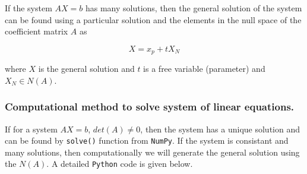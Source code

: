 \documentclass[
  letterpaper,
  DIV=11,
  numbers=noendperiod]{scrreprt}
\theoremstyle{plain}
\theoremstyle{definition}
\theoremstyle{remark}
\begin{document}
\begin{tcolorbox}[enhanced jigsaw, leftrule=.75mm, bottomtitle=1mm, colback=white, toptitle=1mm, opacitybacktitle=0.6, toprule=.15mm, colbacktitle=quarto-callout-note-color!10!white, arc=.35mm, colframe=quarto-callout-note-color-frame, title=\textcolor{quarto-callout-note-color}{\faInfo}\hspace{0.5em}{Use of Null space in creation of general solution from particular
solution}, titlerule=0mm, rightrule=.15mm, left=2mm, bottomrule=.15mm, breakable, coltitle=black, opacityback=0]

If the system \(AX=b\) has many solutions, then the general solution of
the system can be found using a particular solution and the elements in
the null space of the coefficient matrix \(A\) as

\[X=x_p+tX_N\]

where \(X\) is the general solution and \(t\) is a free variable
(parameter) and \(X_N\in N(A)\).

\end{tcolorbox}

\subsubsection*{Computational method to solve system of linear
equations.}\label{computational-method-to-solve-system-of-linear-equations.}

If for a system \(AX=b\), \(det(A)\neq 0\), then the system has a unique
solution and can be found by \texttt{solve()} function from
\texttt{NumPy}. If the system is consistant and many solutions, then
computationally we will generate the general solution using the
\(N(A)\). A detailed \texttt{Python} code is given below.
\end{document}
